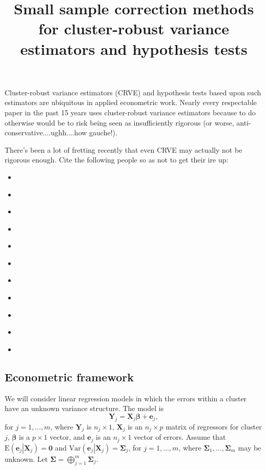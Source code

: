\documentclass[man, noextraspace, floatsintext]{apa6}\usepackage[]{graphicx}\usepackage[]{color}
\title{Small sample correction methods for cluster-robust variance estimators and hypothesis tests}
\newcommand{\E}{\text{E}}
\newcommand{\Var}{\text{Var}}
\newcommand{\bM}{\mathbf}
\newcommand{\bS}{\boldsymbol}
\begin{document}
\maketitle

Cluster-robust variance estimators (CRVE) and hypothesis tests based upon such estimators are ubiquitous in applied econometric work. Nearly every respectable paper in the past 15 years uses cluster-robust variance estimators because to do otherwise would be to risk being seen as insufficiently rigorous (or worse, anti-conservative....ughh....how gauche!).

There's been a lot of fretting recently that even CRVE may actually not be rigorous enough. Cite the following people so as not to get their ire up:
\begin{itemize}
\item \citet{Brewer2013inference}
\item \citet{Cameron2008bootstrap}
\item \citet{Cameron2015practitioners}
\item \citet{Carter2013asymptotic}
\item \citet{Ibragimov2010tstatistic}
\item \citet{Imbens2012robust}
\item \citet{Kezdi2004robust}
\item \citet{McCaffrey2001generalizations}
\item \citet{McCaffrey2006improved}
\item \citet{Webb2013wild}
\item \citet{Kline2012score}
\end{itemize}

\subsection{Econometric framework}

We will consider linear regression models in which the errors within a cluster have an unknown variance structure. The model is
\begin{equation}
\label{eq:model_vector}
\bM{Y}_j = \bM{X}_j \bS\beta + \bM{e}_j,
\end{equation}
for $j=1,...,m$, where $\bM{Y}_j$ is $n_j \times 1$, $\bM{X}_j$ is an $n_j \times p$ matrix of regressors for cluster $j$, $\bS\beta$ is a $p \times 1$ vector, and $\bM{e}_j$ is an $n_j \times 1$ vector of errors. Assume that $\E\left(\bM{e}_j\left|\bM{X}_j\right.\right) = \bM{0}$ and $\Var\left(\bM{e}_j\left|\bM{X}_j\right.\right) = \bS\Sigma_j$, for $j = 1,...,m$, where $\bS\Sigma_1,...,\bS\Sigma_m$ may be unknown. Let $\bS\Sigma = \bigoplus_{j=1}^m \bS\Sigma_j$.
\end{document}
